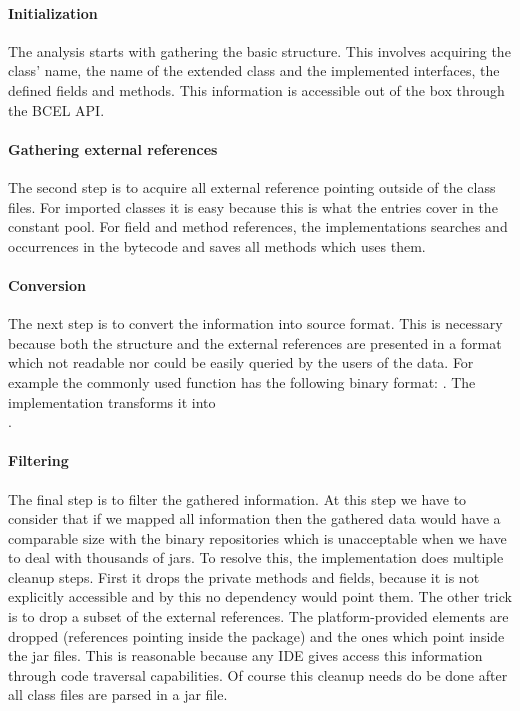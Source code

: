 \paragraph{Initialization}
The analysis starts with gathering the basic structure. This involves acquiring
the class' name, the name of the extended class and the implemented interfaces,
the defined fields and methods. This information is accessible out of the box
through the BCEL API.  

\paragraph{Gathering external references}
The second step is to acquire all external reference pointing outside of the
class files. For imported classes it is easy because this is what the
 entries cover in the constant pool. For field and method
references, the implementations searches  and
 occurrences in the bytecode and saves all methods 
which uses them.

\paragraph{Conversion}
The next step is to convert the information into source format. This is
necessary because both the structure and the external references are presented
in a format which not readable nor could be easily queried by the users of the
data. For example the commonly used  function has the
following binary format: . The implementation
transforms it into \\ 
.

\paragraph{Filtering}
The final step is to filter  the gathered information. At this step we have to
consider that if we mapped all information then the gathered data would have a
comparable size with the binary repositories which is unacceptable when we have
to deal with thousands of jars. To resolve this, the implementation does
multiple cleanup steps. First it drops the private methods and fields, because
it is not explicitly accessible and by this no dependency would point them. The
other trick is to drop a subset of the external references. The
platform-provided elements are dropped (references pointing inside the
 package) and the ones which point inside the jar files. This is
reasonable because any IDE gives access this information through code traversal
capabilities. Of course this cleanup needs do be done after all class files are 
parsed in a jar file. 


